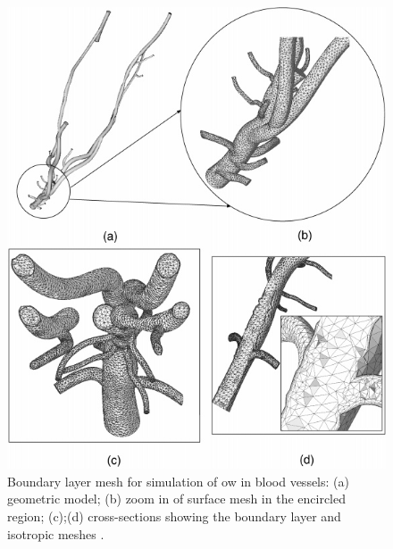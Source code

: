 \begin{figure}
\begin{minipage}{0.45\linewidth}
	\centering
	\includegraphics[width=\linewidth]{img/intro/lit/shephard.png}
	\caption{Boundary layer mesh for simulation of ow in blood vessels: (a) geometric model; (b) zoom in of surface mesh in the encircled region; (c);(d) cross-sections showing the boundary layer and isotropic meshes \cite{garimella2000boundary}.}
	\label{fig-shephard}
\end{minipage}\hfill
\begin{minipage}{0.45\linewidth}
	\centering

\end{minipage}
\end{figure}

